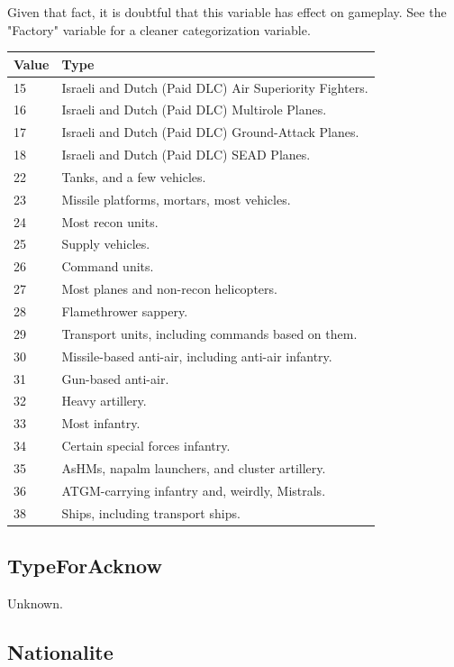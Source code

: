 \documentclass{article}
\begin{document}
Given that fact, it is doubtful that this variable has effect on gameplay. See the "Factory" variable for a cleaner categorization variable.

\begin{center}
    \begin{tabular}{ | l | l |}
    \hline
	Value & Type\\ \hline
	15 & Israeli and Dutch (Paid DLC) Air Superiority Fighters.\\
	16 & Israeli and Dutch (Paid DLC) Multirole Planes.\\
	17 & Israeli and Dutch (Paid DLC) Ground-Attack Planes.\\
	18 & Israeli and Dutch (Paid DLC) SEAD Planes.\\
	22 & Tanks, and a few vehicles.\\
	23 & Missile platforms, mortars, most vehicles.\\
	24 & Most recon units.\\
	25 & Supply vehicles.\\
	26 & Command units.\\
	27 & Most planes and non-recon helicopters.\\
	28 & Flamethrower sappery.\\
	29 & Transport units, including commands based on them.\\
	30 & Missile-based anti-air, including anti-air infantry.\\
	31 & Gun-based anti-air.\\
	32 & Heavy artillery.\\
	33 & Most infantry.\\
	34 & Certain special forces infantry.\\
	35 & AsHMs, napalm launchers, and cluster artillery.\\
	36 & ATGM-carrying infantry and, weirdly, Mistrals.\\
	38 & Ships, including transport ships.\\
    \hline
    \end{tabular}
\end{center}

\subsection{TypeForAcknow}

Unknown.

\subsection{Nationalite}
\end{document}
